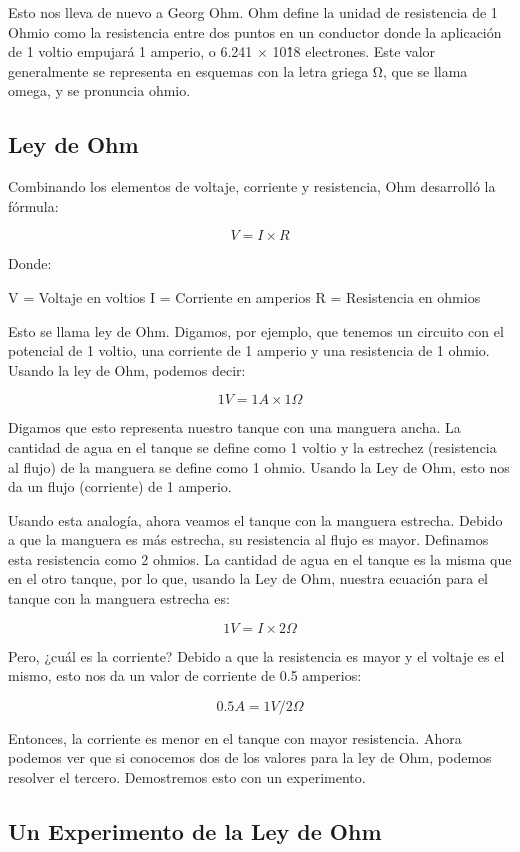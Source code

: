 \documentclass[output=paper, 
colorlinks,
citecolor=brown,
newtxmath
]{langscibook}
\begin{document}
Esto nos lleva de nuevo a Georg Ohm. Ohm define la unidad de resistencia de 1 Ohmio como la resistencia entre dos puntos en un conductor donde la aplicación de 1 voltio empujará 1 amperio, o 6.241 × 10\^18 electrones. Este valor generalmente se representa en esquemas con la letra griega Ω, que se llama omega, y se pronuncia ohmio.

\subsection{Ley de Ohm}

Combinando los elementos de voltaje, corriente y resistencia, Ohm desarrolló la fórmula:

\[V = I \times R\]

Donde:

V = Voltaje en voltios
I = Corriente en amperios
R = Resistencia en ohmios

Esto se llama ley de Ohm. Digamos, por ejemplo, que tenemos un circuito con el potencial de 1 voltio, una corriente de 1 amperio y una resistencia de 1 ohmio. Usando la ley de Ohm, podemos decir:

\[1V = 1A \times 1Ω\]

Digamos que esto representa nuestro tanque con una manguera ancha. La cantidad de agua en el tanque se define como 1 voltio y la estrechez (resistencia al flujo) de la manguera se define como 1 ohmio. Usando la Ley de Ohm, esto nos da un flujo (corriente) de 1 amperio.

Usando esta analogía, ahora veamos el tanque con la manguera estrecha. Debido a que la manguera es más estrecha, su resistencia al flujo es mayor. Definamos esta resistencia como 2 ohmios. La cantidad de agua en el tanque es la misma que en el otro tanque, por lo que, usando la Ley de Ohm, nuestra ecuación para el tanque con la manguera estrecha es:

\[1V = I \times 2Ω\]

Pero, ¿cuál es la corriente? Debido a que la resistencia es mayor y el voltaje es el mismo, esto nos da un valor de corriente de 0.5 amperios:

\[0.5A = 1V / 2Ω\]

Entonces, la corriente es menor en el tanque con mayor resistencia. Ahora podemos ver que si conocemos dos de los valores para la ley de Ohm, podemos resolver el tercero. Demostremos esto con un experimento.

\subsection{Un Experimento de la Ley de Ohm}
\end{document}
